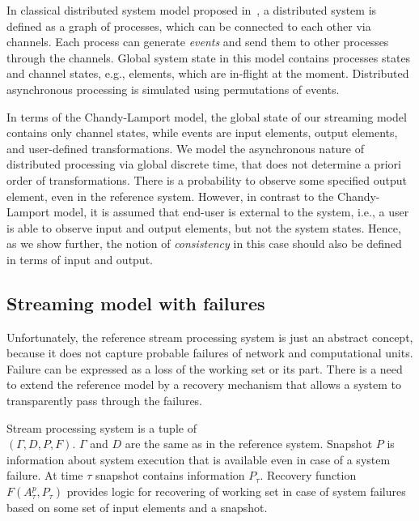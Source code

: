 In classical distributed system model proposed in~\cite{Chandy:1985:DSD:214451.214456}, a distributed system is defined as a graph of processes, which can be connected to each other via channels. Each process can generate {\em events} and send them to other processes through the channels. Global system state in this model contains processes states and channel states, e.g., elements, which are in-flight at the moment. Distributed asynchronous processing is simulated using permutations of events. 

In terms of the Chandy-Lamport model, the global state of our streaming model contains only channel states, while events are input elements, output elements, and user-defined transformations. We model the asynchronous nature of distributed processing via global discrete time, that does not determine a priori order of transformations. There is a probability to observe some specified output element, even in the reference system. However, in contrast to the Chandy-Lamport model, it is assumed that end-user is external to the system, i.e., a user is able to observe input and output elements, but not the system states. Hence, as we show further, the notion of {\em consistency} in this case should also be defined in terms of input and output.  

\subsection{Streaming model with failures}

Unfortunately, the reference stream processing system is just an abstract concept, because it does not capture probable failures of network and computational units. Failure can be expressed as a loss of the working set or its part. There is a need to extend the reference model by a recovery mechanism that allows a system to transparently pass through the failures.


\begin{definition}{Stream processing system}
is a tuple of\\
$(\Gamma,D,P,F)$. $\Gamma$ and $D$ are the same as in the reference system. Snapshot $P$ is information about system execution that is available even in case of a system failure. At time $\tau$ snapshot contains information $P_\tau$. Recovery function $F(A^{p}_\tau,P_\tau)$ provides logic for recovering of working set in case of system failures based on some set of input elements and a snapshot.
\end{definition}

